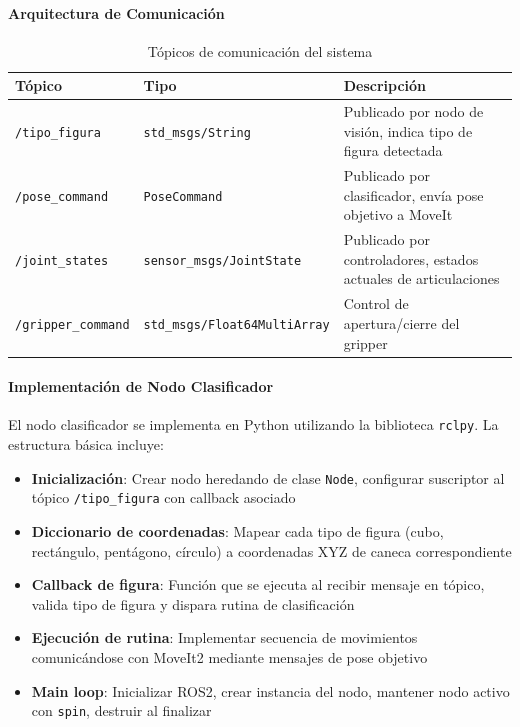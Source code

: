 \paragraph{Arquitectura de Comunicación}

\begin{table}[H]
\centering
\caption{Tópicos de comunicación del sistema}
\label{tab:topics}
\small
\begin{tabular}{|l|l|p{6cm}|}
\hline
\textbf{Tópico} & \textbf{Tipo} & \textbf{Descripción} \\
\hline
\texttt{/tipo\_figura} & \texttt{std\_msgs/String} & Publicado por nodo de visión, indica tipo de figura detectada \\
\texttt{/pose\_command} & \texttt{PoseCommand} & Publicado por clasificador, envía pose objetivo a MoveIt \\
\texttt{/joint\_states} & \texttt{sensor\_msgs/JointState} & Publicado por controladores, estados actuales de articulaciones \\
\texttt{/gripper\_command} & \texttt{std\_msgs/Float64MultiArray} & Control de apertura/cierre del gripper \\
\hline
\end{tabular}
\end{table}

\paragraph{Implementación de Nodo Clasificador}

El nodo clasificador se implementa en Python utilizando la biblioteca \texttt{rclpy}. La estructura básica incluye:

\begin{itemize}
    \item \textbf{Inicialización}: Crear nodo heredando de clase \texttt{Node}, configurar suscriptor al tópico \texttt{/tipo\_figura} con callback asociado
    \item \textbf{Diccionario de coordenadas}: Mapear cada tipo de figura (cubo, rectángulo, pentágono, círculo) a coordenadas XYZ de caneca correspondiente
    \item \textbf{Callback de figura}: Función que se ejecuta al recibir mensaje en tópico, valida tipo de figura y dispara rutina de clasificación
    \item \textbf{Ejecución de rutina}: Implementar secuencia de movimientos comunicándose con MoveIt2 mediante mensajes de pose objetivo
    \item \textbf{Main loop}: Inicializar ROS2, crear instancia del nodo, mantener nodo activo con \texttt{spin}, destruir al finalizar
\end{itemize}

